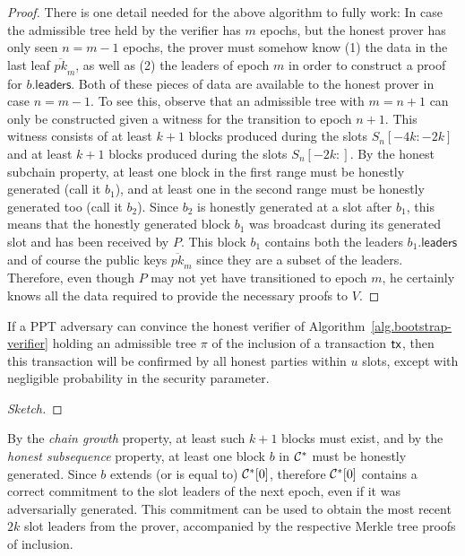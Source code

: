 \begin{proof}
  There is one detail needed for the above algorithm to fully work: In case the
  admissible tree held by the verifier has $m$ epochs, but the honest prover
  has only seen $n = m - 1$ epochs, the prover must somehow know (1) the data
  in the last leaf $\overline{pk}_m$, as well as (2) the leaders of epoch $m$
  in order to construct a proof for $b\textsf{.leaders}$. Both of these pieces
  of data are available to the honest prover in case $n = m - 1$. To see this,
  observe that an admissible tree with $m = n + 1$ can only be constructed given
  a witness for the transition to epoch $n + 1$. This witness consists of at
  least $k+1$ blocks produced during the slots $S_n[-4k{:}-2k]$ and at least
  $k+1$ blocks produced during the slots $S_n[-2k{:}]$. By the honest
  subchain property, at least one block in the first range must be honestly
  generated (call it $b_1$), and at least one in the second range must be
  honestly generated too (call it $b_2$). Since $b_2$ is honestly generated
  at a slot after $b_1$, this means that the honestly generated block $b_1$
  was broadcast during its generated slot and has been received by $P$.
  This block $b_1$ contains both the leaders
  $b_1\textsf{.leaders}$ and of course the public keys $\overline{pk}_m$
  since they are a subset of the leaders. Therefore, even though $P$ may
  not yet have transitioned to epoch $m$, he certainly knows all the data
  required to provide the necessary proofs to $V$.
\end{proof}

\begin{lemma}
  If a PPT adversary can convince the honest verifier
  of Algorithm~\ref{alg.bootstrap-verifier}
  holding an admissible tree $\pi$
  of the inclusion of
  a transaction $\mathsf{tx}$, then this transaction will be confirmed by all honest parties
  within $u$ slots, except with negligible probability in the security parameter.
\end{lemma}
\begin{proof}[Sketch]
\end{proof}

By the \emph{chain growth} property, at least such
$k+1$ blocks must exist, and by the \emph{honest subsequence} property, at least one block $b$ in $\mathcal{C}^*$
must be honestly generated. Since $b$ extends (or is equal to) $\mathcal{C}^*[0]$, therefore $\mathcal{C}^*[0]$
contains a correct commitment to the slot leaders of the next epoch, even if it was adversarially generated.
This commitment can be used to obtain the most recent $2k$ slot leaders from the prover, accompanied
by the respective Merkle tree proofs of inclusion.
